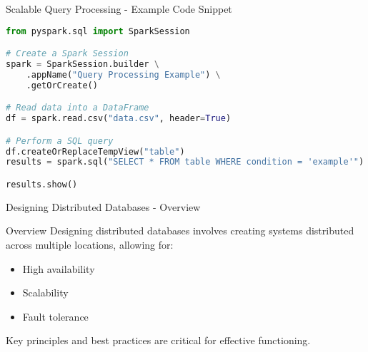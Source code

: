 \documentclass[aspectratio=169]{beamer}
\begin{document}
\begin{frame}[fragile]{Scalable Query Processing - Example Code Snippet}
  \begin{lstlisting}[language=Python]
from pyspark.sql import SparkSession

# Create a Spark Session
spark = SparkSession.builder \
    .appName("Query Processing Example") \
    .getOrCreate()

# Read data into a DataFrame
df = spark.read.csv("data.csv", header=True)

# Perform a SQL query
df.createOrReplaceTempView("table")
results = spark.sql("SELECT * FROM table WHERE condition = 'example'")

results.show()
  \end{lstlisting}
\end{frame}

\begin{frame}[fragile]{Designing Distributed Databases - Overview}
    \begin{block}{Overview}
        Designing distributed databases involves creating systems distributed across multiple locations, allowing for:
        \begin{itemize}
            \item High availability
            \item Scalability
            \item Fault tolerance
        \end{itemize}
        Key principles and best practices are critical for effective functioning.
    \end{block}
\end{frame}
\end{document}
